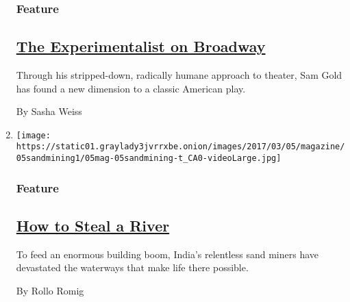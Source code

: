 \begin{enumerate}
  \hypertarget{feature-2}{%
  \subsubsection{Feature}\label{feature-2}}

  \hypertarget{the-experimentalist-on-broadway}{%
  \subsection{\texorpdfstring{\href{/2017/03/01/magazine/sam-gold-the-glass-menagerie-the-experimentalist-on-broadway.html}{The
  Experimentalist on
  Broadway}}{The Experimentalist on Broadway}}\label{the-experimentalist-on-broadway}}

  Through his stripped-down, radically humane approach to theater, Sam
  Gold has found a new dimension to a classic American play.

  By Sasha Weiss
\item
  \texttt{[image: https://static01.graylady3jvrrxbe.onion/images/2017/03/05/magazine/05sandmining1/05mag-05sandmining-t\_CA0-videoLarge.jpg]}

  \hypertarget{feature-3}{%
  \subsubsection{Feature}\label{feature-3}}

  \hypertarget{how-to-steal-a-river}{%
  \subsection{\texorpdfstring{\href{/2017/03/01/magazine/sand-mining-india-how-to-steal-a-river.html}{How
  to Steal a River}}{How to Steal a River}}\label{how-to-steal-a-river}}

  To feed an enormous building boom, India's relentless sand miners have
  devastated the waterways that make life there possible.

  By Rollo Romig
\end{enumerate}


